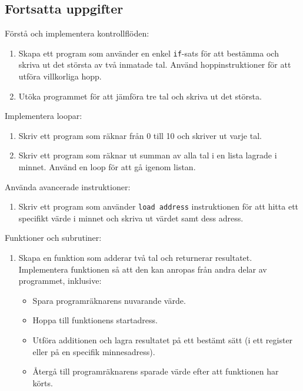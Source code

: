 \subsection*{Fortsatta uppgifter}
\begin{Datorarbete}
    \item Förstå och implementera kontrollflöden:
    \begin{enumerate}
        \item Skapa ett program som använder en enkel \texttt{if}-sats för att bestämma och skriva ut det största av två inmatade tal. Använd hoppinstruktioner för att utföra villkorliga hopp.
        \item Utöka programmet för att jämföra tre tal och skriva ut det största.
    \end{enumerate}

    \item Implementera loopar:
    \begin{enumerate}
        \item Skriv ett program som räknar från 0 till 10 och skriver ut varje tal.
        \item Skriv ett program som räknar ut summan av alla tal i en lista lagrade i minnet. Använd en loop för att gå igenom listan.
    \end{enumerate}

    \item Använda avancerade instruktioner:
    \begin{enumerate}
        \item Skriv ett program som använder \texttt{load address} instruktionen för att hitta ett specifikt värde i minnet och skriva ut värdet samt dess adress.
    \end{enumerate}

    \item Funktioner och subrutiner:
    \begin{enumerate}
        \item Skapa en funktion som adderar två tal och returnerar resultatet. Implementera funktionen så att den kan anropas från andra delar av programmet, inklusive:
              \begin{itemize}
                  \item Spara programräknarens nuvarande värde.
                  \item Hoppa till funktionens startadress.
                  \item Utföra additionen och lagra resultatet på ett bestämt sätt (i ett register eller på en specifik minnesadress).
                  \item Återgå till programräknarens sparade värde efter att funktionen har körts.
              \end{itemize}
    \end{enumerate}


\end{Datorarbete}
